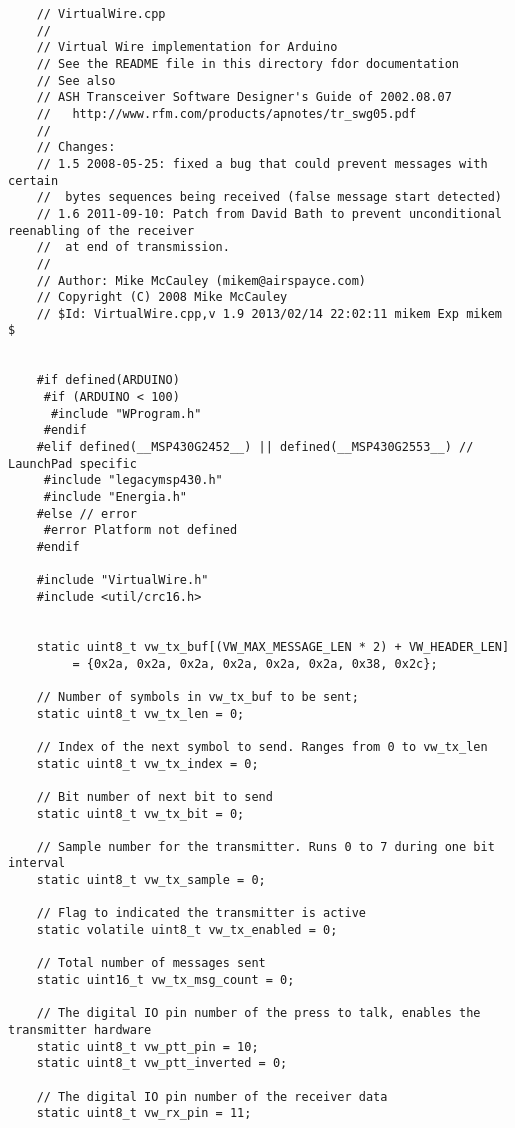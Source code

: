 \begin{verbatim}
    // VirtualWire.cpp
    //
    // Virtual Wire implementation for Arduino
    // See the README file in this directory fdor documentation
    // See also
    // ASH Transceiver Software Designer's Guide of 2002.08.07
    //   http://www.rfm.com/products/apnotes/tr_swg05.pdf
    //
    // Changes:
    // 1.5 2008-05-25: fixed a bug that could prevent messages with certain
    //  bytes sequences being received (false message start detected)
    // 1.6 2011-09-10: Patch from David Bath to prevent unconditional reenabling of the receiver
    //  at end of transmission.
    //
    // Author: Mike McCauley (mikem@airspayce.com)
    // Copyright (C) 2008 Mike McCauley
    // $Id: VirtualWire.cpp,v 1.9 2013/02/14 22:02:11 mikem Exp mikem $


    #if defined(ARDUINO)
     #if (ARDUINO < 100)
      #include "WProgram.h"
     #endif
    #elif defined(__MSP430G2452__) || defined(__MSP430G2553__) // LaunchPad specific
     #include "legacymsp430.h"
     #include "Energia.h"
    #else // error
     #error Platform not defined
    #endif

    #include "VirtualWire.h"
    #include <util/crc16.h>


    static uint8_t vw_tx_buf[(VW_MAX_MESSAGE_LEN * 2) + VW_HEADER_LEN] 
         = {0x2a, 0x2a, 0x2a, 0x2a, 0x2a, 0x2a, 0x38, 0x2c};

    // Number of symbols in vw_tx_buf to be sent;
    static uint8_t vw_tx_len = 0;

    // Index of the next symbol to send. Ranges from 0 to vw_tx_len
    static uint8_t vw_tx_index = 0;

    // Bit number of next bit to send
    static uint8_t vw_tx_bit = 0;

    // Sample number for the transmitter. Runs 0 to 7 during one bit interval
    static uint8_t vw_tx_sample = 0;

    // Flag to indicated the transmitter is active
    static volatile uint8_t vw_tx_enabled = 0;

    // Total number of messages sent
    static uint16_t vw_tx_msg_count = 0;

    // The digital IO pin number of the press to talk, enables the transmitter hardware
    static uint8_t vw_ptt_pin = 10;
    static uint8_t vw_ptt_inverted = 0;

    // The digital IO pin number of the receiver data
    static uint8_t vw_rx_pin = 11;


\end{verbatim}
